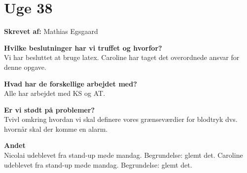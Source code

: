 \section{Uge 38}

\textbf{Skrevet af:} 
Mathias Egsgaard

\textbf{Hvilke beslutninger har vi truffet og hvorfor?} \\
Vi har besluttet at bruge latex. Caroline har taget det overordnede ansvar for denne opgave. 

\textbf{Hvad har de forskellige arbejdet med? } \\
Alle har arbejdet med KS og AT.  

\textbf{Er vi stødt på problemer? } \\
Tvivl omkring hvordan vi skal definere vores grænseværdier for blodtryk dvs. hvornår skal der komme en alarm. 

\textbf{Andet} \\
Nicolai udeblevet fra stand-up møde mandag. Begrundelse: glemt det.
Caroline udeblevet fra stand-up møde mandag. Begrundelse: glemt det.


\clearpage